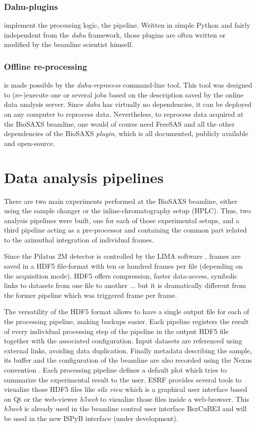 \documentclass[preprint]{iucr}              %
\begin{document}
\subsubsection{Dahu-plugins} implement the processing logic, the pipeline.
Written in simple Python and fairly independent from the \textit{dahu} framework, those plugins are often written or modified by the beamline scientist himself.

\subsubsection{Offline re-processing}
is made possible by the \textit{dahu-reprocess} command-line tool.
This tool was designed to (re-)execute one or several jobs based on the description saved by the online data analysis server. 
Since \textit{dahu} has virtually no dependencies, it can be deployed on any computer to reprocess data. 
Nevertheless, to reprocess data acquired at the BioSAXS beamline, one would of course need FreeSAS and all the other dependencies of the BioSAXS \textit{plugin}, which is all documented, publicly available and open-source.

\section{Data analysis pipelines}
\label{pipeline}
There are two main experiments performed at the BioSAXS beamline, either using the sample changer or the inline-chromatography setup (HPLC).
Thus, two analysis pipelines were built, one for each of those experimental setups, and a third pipeline acting as a pre-processor and containing the common part related to the azimuthal integration of individual frames.

Since the Pilatus 2M detector is controlled by the LIMA software \cite{lima}, frames are saved in a HDF5 file-format \cite{hdf5} with ten or hundred frames per file (depending on the acquisition mode).
HDF5 offers compression, faster data-access, symbolic links to datasets from one file to another ... but it is dramatically different from the former pipeline which was triggered frame per frame.

The versatility of the HDF5 format allows to have a single output file for each of the processing pipeline, making backups easier.
Each pipeline registers the result of every individual processing step of the pipeline in the output HDF5 file together with the associated configuration.
Input datasets are referenced using external links, avoiding data duplication. 
Finally metadata describing the sample, its buffer and the configuration of the beamline are also recorded using the Nexus convention \cite{nexus}.
Each processing pipeline defines a default plot which tries to summarize the experimental result to the user.
ESRF provides several tools to visualize those HDF5 files like \textit{silx view} \cite{silx} which is a graphical user interface based on Qt \cite{pyqt} or the web-viewer \textit{h5web} \cite{h5web} to visualize those files inside a web-browser.
This \textit{h5web} is already used in the beamline control user interface BsxCuBE3 \cite{bm29_2022} and will be used in the new ISPyB interface (under development).
\end{document}
